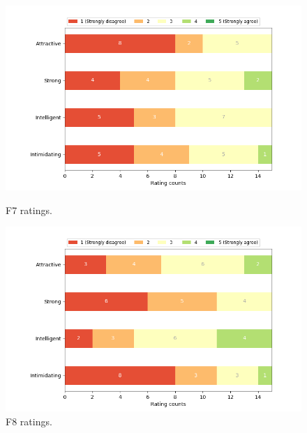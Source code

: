 \begin{figure}[H]
  \includegraphics[width=\linewidth]{Survey/FRatings/avatar_f7.png}
  \caption{F7 ratings.}
\endminipage\hfill
{}
  \includegraphics[width=\linewidth]{Survey/FRatings/avatar_f8.png}
  \caption{F8 ratings.}
\endminipage\hfill
\end{figure}
